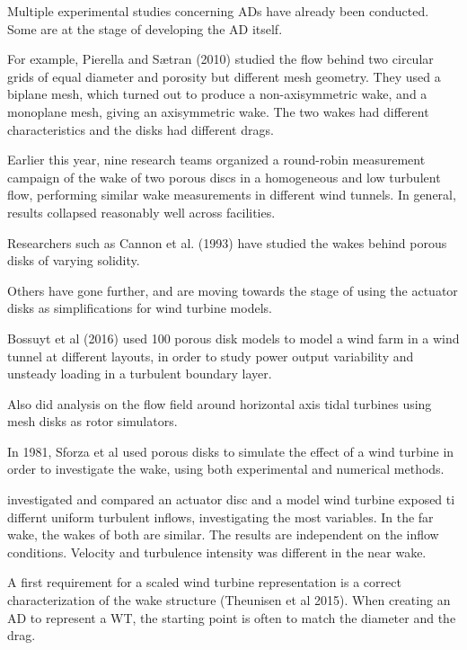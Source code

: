 Multiple experimental studies concerning ADs have already been conducted. Some are at the stage of developing the AD itself. 

For example, Pierella and Sætran (2010) \cite{Pierella2010} studied the flow behind two circular grids of equal diameter and porosity but different mesh geometry. They used a biplane mesh, which turned out to produce a non-axisymmetric wake, and a monoplane mesh, giving an axisymmetric wake. The two wakes had different characteristics and the disks had different drags.

Earlier this year, nine research teams organized a round-robin measurement campaign of the wake of two porous discs in a homogeneous and low turbulent flow, performing similar wake measurements in different wind tunnels. \cite{Aubrun2019} In general, results collapsed reasonably well across facilities. 

Researchers such as Cannon et al. (1993) \cite{Cannon1993} have studied the wakes behind porous disks of varying solidity.

Others have gone further, and are moving towards the stage of using the actuator disks as simplifications for wind turbine models. 

Bossuyt et al (2016) \cite{Bossuyt2016} used 100 porous disk models to model a wind farm in a wind tunnel at different layouts, in order to study power output variability and unsteady loading in a turbulent boundary layer.  

Also \cite{Myers2010} did analysis on the flow field around horizontal axis tidal turbines using mesh disks as rotor simulators. 

In 1981, Sforza et al \cite{Sforza1981} used porous disks to simulate the effect of a wind turbine in order to investigate the wake, using both experimental and numerical methods.

\cite{Neunaber} investigated and compared an actuator disc and a model wind turbine exposed ti differnt uniform turbulent inflows, investigating the most variables. In the far wake, the wakes of both are similar. The results are independent on the inflow conditions. Velocity and turbulence intensity was different in the near wake. 



A first requirement for a scaled wind turbine representation is a correct characterization of the wake structure (Theunisen et al 2015). When creating an AD to represent a WT, the starting point is often to match the diameter and the drag. 

